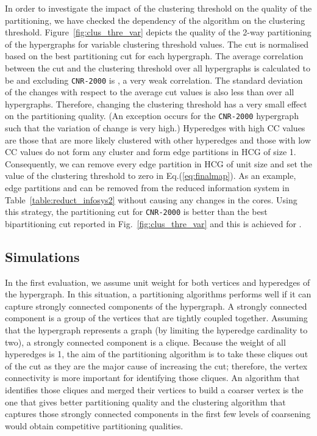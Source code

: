 \documentclass[twocolumn]{svjour3}          \smartqed
\begin{document}
In order to investigate the impact of the clustering threshold on the quality of the partitioning, we have checked the dependency of the algorithm on the clustering threshold. Figure~\ref{fig:clus_thre_var} depicts the quality of the {2-way} partitioning of the hypergraphs for variable clustering threshold values. The cut is normalised based on the best partitioning cut for each hypergraph. The average correlation between the cut and the clustering threshold over all hypergraphs is calculated to be  and excluding \texttt{CNR-2000} is , a very weak correlation. The standard deviation of the changes with respect to the average cut values is also less than  over all hypergraphs. Therefore, changing the clustering threshold has a very small effect on the partitioning quality. (An exception occurs for the \texttt{CNR-2000} hypergraph such that the variation of change is very high.) Hyperedges with high CC values are those that are more likely clustered with other hyperedges and those with low CC values do not form any cluster and form edge partitions in HCG of size 1. Consequently, we can remove every edge partition in HCG of unit size and set the value of the clustering threshold to zero in Eq.(\ref{eq:finalmap}). As an example, edge partitions  and  can be removed from the reduced information system in Table~\ref{table:reduct_infosys2} without causing any changes in the cores. Using this strategy, the partitioning cut for \texttt{CNR-2000} is  better than the best bipartitioning cut reported in Fig.~\ref{fig:clus_thre_var} and this is achieved for .


\subsection{Simulations}\label{sec:simulations}

In the first evaluation, we assume unit weight for both vertices and hyperedges of the hypergraph. In this situation, a partitioning algorithms performs well if it can capture strongly connected components of the hypergraph.  A strongly connected component is a group of the vertices that are tightly coupled together. Assuming that the hypergraph represents a graph (by limiting the hyperedge cardinality to two), a strongly connected component is a clique. Because the weight of all hyperedges is 1, the aim of the partitioning algorithm is to take these cliques out of the cut as they are the major cause of increasing the cut; therefore, the vertex connectivity is more important for identifying those cliques. An algorithm that identifies those cliques and merged their vertices to build a coarser vertex is the one that gives better partitioning quality and the clustering algorithm that captures those strongly connected components in the first few levels of coarsening would obtain competitive partitioning qualities.
\end{document}
